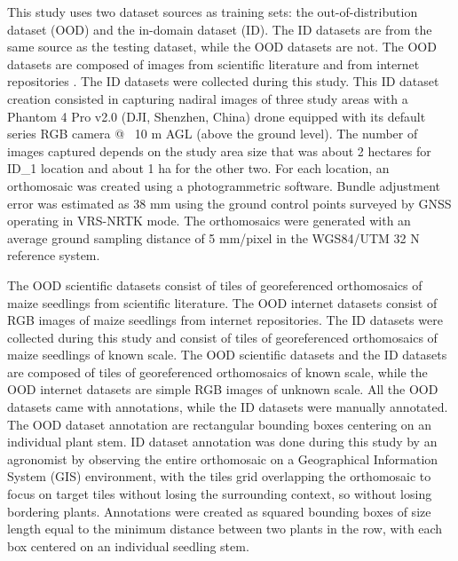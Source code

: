 \documentclass[journal,article,submit,pdftex,moreauthors]{Definitions/mdpi}
\begin{document}
This study uses two dataset sources as training sets: the out-of-distribution dataset (OOD)
and the in-domain dataset (ID). The ID datasets are from the same source as the
testing dataset, while the OOD datasets are not.
The OOD datasets are composed of images from scientific literature \cite{liuEstimatingMaizeSeedling2022,davidPlantDetectionCounting2021}
and from internet repositories \cite{Maize_seedingDatasetOverview,MaizeseedlingdetectionDatasetOverview}.
The ID datasets were collected during this study. This ID dataset creation consisted in
capturing nadiral images of three study areas with a Phantom 4 Pro v2.0 (DJI, Shenzhen, China)
drone equipped with its default series RGB camera @ ~10 m AGL (above the ground level).
The number of images captured depends on the study area size that was about 2 hectares
for ID\_1 location and about 1 ha for the other two.
For each location, an orthomosaic was created using a photogrammetric software.
Bundle adjustment error was estimated as 38 mm using the ground control points
surveyed by GNSS operating in VRS-NRTK mode. The orthomosaics were generated with an 
average ground sampling distance of 5 mm/pixel in the WGS84/UTM 32 N reference system.

The OOD scientific datasets consist of tiles of georeferenced orthomosaics of maize seedlings from scientific literature.
The OOD internet datasets consist of RGB images of maize seedlings from internet repositories.
The ID datasets were collected during this study and consist of tiles of georeferenced orthomosaics of maize seedlings of known scale.
The OOD scientific datasets and the ID datasets are composed of tiles of georeferenced orthomosaics 
of known scale, while the OOD internet datasets are simple RGB images of unknown scale.
All the OOD datasets came with annotations, while the ID datasets were manually annotated.
The OOD dataset annotation are rectangular bounding boxes centering on an individual plant stem.
ID dataset annotation was done during this study by an agronomist by observing the 
entire orthomosaic on a Geographical Information System (GIS) environment, 
with the tiles grid
overlapping the orthomosaic to focus on target tiles without losing the surrounding
context, so without losing bordering plants. Annotations were created as squared 
bounding boxes of size length equal to the minimum distance between two plants in the row, 
with each box centered on an individual seedling stem. 
\end{document}
